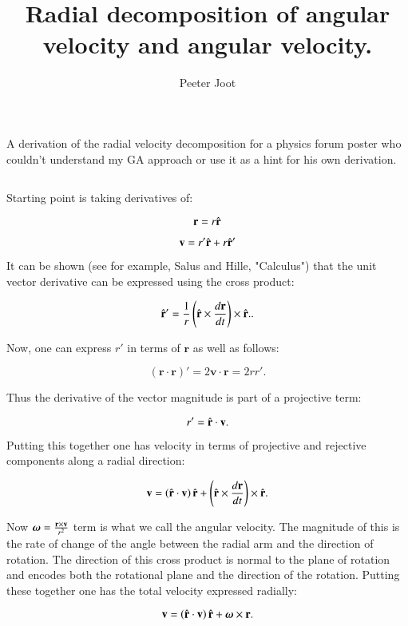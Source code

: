 \documentclass{article}      %
\title{ Radial decomposition of angular velocity and angular velocity.} %
\author{Peeter Joot}         %
\begin{document}

\maketitle{}

\section{}

A derivation of the radial velocity decomposition for a physics forum 
poster who couldn't understand my GA approach or use it as a hint for his
own derivation.

\subsection{}

Starting point is taking derivatives of:

\[
\mathbf{r} = r \hat{\mathbf{r}}
\]

\[
\mathbf{v} = r' \hat{\mathbf{r}} + r \hat{\mathbf{r}}'
\]

It can be shown (see for example, Salus and Hille, "Calculus") that the unit vector derivative can be expressed using the cross product:

\[
\hat{\mathbf{r}}' = \frac{1}{r} \left(\hat{\mathbf{r}} \times \frac{d\mathbf{r}}{dt}\right) \times \hat{\mathbf{r}}..
\]

Now, one can express $r'$ in terms of $\mathbf{r}$ as well as follows:

\[
\left(\mathbf{r} \cdot \mathbf{r}\right)' = 2 \mathbf{v} \cdot \mathbf{r} = 2 r r'.
\]

Thus the derivative of the vector magnitude is part of a projective term:

\[
r' = \hat{\mathbf{r}} \cdot \mathbf{v}.
\]

Putting this together one has velocity in terms of projective and rejective
components along a radial direction:

\[
\mathbf{v} = \left(\hat{\mathbf{r}} \cdot \mathbf{v}\right) \hat{\mathbf{r}} + \left(\hat{\mathbf{r}} \times \frac{d\mathbf{r}}{dt}\right) \times \hat{\mathbf{r}}.
\]

Now $\boldsymbol{\omega} = \frac{\mathbf{r} \times \mathbf{v}}{r^2}$ term is what we call the angular velocity.  The magnitude of this
is the rate of change of the angle between the radial arm and the direction of rotation.  The direction of this
cross product is normal to the plane of rotation and encodes both the rotational plane and the direction of the
rotation.  Putting these together one has the total velocity expressed radially:

\[
\mathbf{v} = \left(\hat{\mathbf{r}} \cdot \mathbf{v}\right) \hat{\mathbf{r}} + \boldsymbol{\omega} \times \mathbf{r}.
\]
\end{document}

